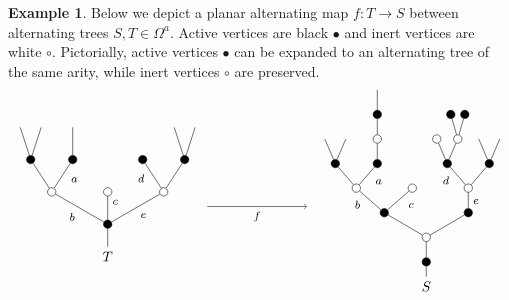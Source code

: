 \documentclass[a4paper,10pt
,draft
]{article}%
\numberwithin{equation}{section}
\numberwithin{figure}{section}
\theoremstyle{definition} %
\newtheorem{example}[equation]{Example}%
\newcommand{\1}{\ensuremath{\mathbbm 1}}%
\begin{document}
\begin{example}\label{ALTMAP EX}
	Below we depict a planar alternating map $f \colon T \to S$
	between alternating trees $S,T \in \Omega^a$.
	Active vertices are black $\bullet$ and inert vertices are white $\circ$.
	Pictorially, active vertices $\bullet$
	can be expanded to an alternating tree of the same arity,
	while inert vertices $\circ$ are preserved.
	\[
	\begin{tikzpicture}[grow=up,auto,level distance=2.3em,every node/.style = {font=\footnotesize},dummy/.style={circle,draw,inner sep=0pt,minimum size=2.1mm}]
	\tikzstyle{level 2}=[sibling distance = 4em]
	\tikzstyle{level 3}=[sibling distance = 3em]
	\tikzstyle{level 4}=[sibling distance = 1.5em]
	\node at (0,0.75) [font = \normalsize] {$T$}
	child{node [dummy,fill = black] {}
		child{node [dummy,fill=white] {}
			child{node [dummy,fill = black] {}
				child
				child
			}
			child{node [dummy,fill = black] {}
				edge from parent node [near end] {$d$}}
			edge from parent node [swap] {$e$}}
		child{node [dummy,fill=white] {}
			edge from parent node [swap, near end] {$c$}}
		child{node [dummy,fill=white] {}
			child{node [dummy,fill = black] {}
				child
				edge from parent node [swap, near end] {$a\phantom{d}$}}
			child{node [dummy,fill = black] {}
				child
				child
			}
			edge from parent node {$b$}}
	};
	\begin{scope}[level distance=1.75em]
	\tikzstyle{level 3}=[sibling distance = 6em]
	\tikzstyle{level 4}=[sibling distance = 4em]
	\tikzstyle{level 5}=[sibling distance = 3em]
	\tikzstyle{level 6}=[sibling distance = 1.5em]
	\tikzstyle{level 7}=[sibling distance = 1em]
	\node at (8,0) [font = \normalsize] {$S$}
	child{node [dummy,fill = black] {}
		child{node [dummy,fill = white] {}
			child{node [dummy,fill = black] {}
				child{node [dummy,fill=white] {}
					child{node [dummy,fill = black] {}
						child
						child
					}
					child{node [dummy,fill = black] {}
						child{node [dummy,fill=white] {}
							child{node [dummy,fill = black] {}}
							child{node [dummy,fill = black] {}}
						}
						child{node [dummy,fill=white] {}}
						edge from parent node [near end] {$d$}}
					edge from parent node [swap] {$e\phantom{1}$}}
			}
			child{node [dummy,fill = black] {}
				child{node [dummy,fill=white] {}
					edge from parent node [swap, near end] {$c\phantom{1}$}}
				child{node [dummy,fill=white] {}
					child{node [dummy,fill = black] {}
						child{node [dummy,fill=white] {}
							child{node [dummy,fill = black] {}
								child
							}
						}
						edge from parent node [swap,near end] {$a\phantom{d}$}}
					child{node [dummy,fill = black] {}
						child
						child
					}
					edge from parent node [near end] {$\phantom{1}b$}}
			}
		}
	};
	\end{scope}
	\draw [->] (2.5,2) -- node [swap] {$f$} (5,2);
	\end{tikzpicture}
	\]
\end{example}
\end{document}
